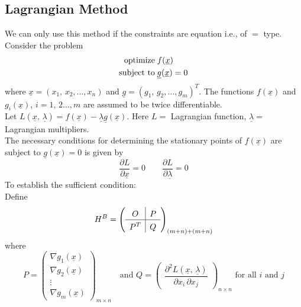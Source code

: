 \documentclass[../main-sheet.tex]{subfiles}
\begin{document}
\subsection{Lagrangian Method}
We can only use this method if the constraints are equation i.e., of \(=\) type.\\
Consider the problem
\begin{align*}
    \text{optimize}              &\; f(\underline{x}) \\
    \text{subject to} &\;
    \begin{alignedat}[t]{1}
        \underline{g}(\underline{x}) & = 0
    \end{alignedat}
    \end{align*}
    where \(\underline{x}=(x_1,\,x_2,\dots,x_n)\) and \(\underline{g}=(g_1,\,g_2,\dots,g_m)^T\). The functions \(f(\underline{x})\) and \(g_i(\underline{x})\), \(i=1,\,2\dots, m\) are assumed to be twice differentiable.\\
        Let \(L(\underline{x},\,\underline{\lambda})=f(\underline{x})-\underline{\lambda}\underline{g}(\underline{x})\). Here \(L=\) Lagrangian function, \(\underline{\lambda}=\) Lagrangian multipliers.\\
        The necessary conditions for determining the stationary points of \(f(\underline{x})\) are subject to \(\underline{g}(\underline{x})=0\) is given by
        \[
            \frac{\partial L}{\partial \underline{x}}=0\qquad\frac{\partial L}{\partial \underline{\lambda}}=0
        \]
        To establish the sufficient condition:\\
        Define
        \[
            H^B = \left(
                \setlength{\extrarowheight}{3pt}
                \begin{array}{c|c}
              O & P\\
              \hline
              P^T & Q
            \end{array}
            \right)_{(m+n)+(m+n)}
        \]
        where
        \[P=\begin{pmatrix}
            \nabla g_1(\underline{x})\\
            \nabla g_2(\underline{x})\\
            \vdots\\
            \nabla g_m(\underline{x})
        \end{pmatrix}_{m\times n}\quad \text{and } Q=\begin{pmatrix}
            \dfrac{\partial^2 L(\underline{x},\,\underline{\lambda})}{\partial x_i\,\partial x_j}
        \end{pmatrix}_{n\times n} \text{ for all }i\text{ and }j\]
\end{document}
